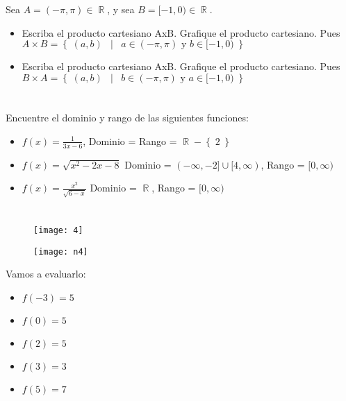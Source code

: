 \documentclass[journal,onecolumn,10pt,fleqn]{IEEEtran}%
\DeclareMathOperator \Space     {\quad}                         %
\DeclareMathOperator \MiniSpace {\;}                            %
\newcommand \Such           {\MiniSpace | \MiniSpace}           %
\theoremstyle{break}                                            %
\DeclareMathOperator \Reals        {\mathbb{R}}                 %
\newcommand{\Set}[1]            {\left\{ \; #1 \; \right\}}     %
\begin{document}
\section{}
  Sea $A = (-\pi, \pi) \in \Reals$, y sea $B = [-1, 0) \in \Reals$.


  \begin{itemize}
    \item Escriba el producto cartesiano AxB. Grafique el producto cartesiano.
    Pues $A \times B = \Set{(a, b) \Such a \in (-\pi, \pi) \text{ y } b \in [-1, 0)}$


    \item Escriba el producto cartesiano AxB. Grafique el producto cartesiano.
    Pues $B \times A = \Set{(a, b) \Such b \in (-\pi, \pi) \text{ y } a \in [-1, 0)}$
    
  \end{itemize}




\section{}
  Encuentre el dominio y rango de las siguientes funciones:

  \begin{itemize}
    \item $f(x) = \frac{1}{3x - 6}$, Dominio = Rango = $\Reals - \Set{2}$
    \item $f(x) = \sqrt{x^2 - 2x - 8}$
    Dominio = $(-\infty, -2] \cup [4, \infty)$,
    Rango = $[0, \infty)$
    \item $f(x) = \frac{x^2}{\sqrt{6 - x}}$
    Dominio = $\Reals$,
    Rango = $[0, \infty)$
  \end{itemize}


\section{}
  \begin{figure}[ht]
    \texttt{[image: 4]}
  \end{figure}

  \begin{figure}[ht]
    \texttt{[image: n4]}
  \end{figure}

  Vamos a evaluarlo:
  \begin{itemize}
    \item $f(-3) = 5$
    \item $f(0) = 5$
    \item $f(2) = 5$
    \item $f(3) = 3$
    \item $f(5) = 7$
  \end{itemize}
\end{document}
